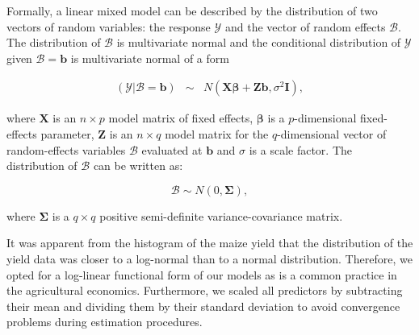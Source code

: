\documentclass[12pt]{iopart}
\begin{document}
Formally, a linear mixed model can be described by the distribution of two vectors of random variables: the response $\mathscr{Y}$ and the vector of random effects $\mathscr{B}$. The distribution of $\mathscr{B}$ is multivariate normal and the conditional distribution of $\mathscr{Y}$ given $\mathscr{B}=\mathbf{b}$ is multivariate normal of a form %




\begin{equation}\label{MixedGeneral}
\begin{array}{lcl}

(\mathscr{Y}|\mathscr{B}=\mathbf{b})& \sim & \mathit{N}(\mathbf{X}\mathbf{\beta}+\mathbf{Z}\mathbf{b},\sigma^2\mathbf{I}),

\end{array}
\end{equation}

where $\mathbf{X}$ is an $n \times p$ model matrix of fixed effects, $\mathbf{\beta}$ is a $p$-dimensional fixed-effects parameter, $\mathbf{Z}$ is an $n \times q$ model matrix for the $q$-dimensional vector of random-effects variables $\mathscr{B}$ evaluated at $\mathbf{b}$ and $\sigma$ is a scale factor. The distribution of $\mathscr{B}$ can be written as: 

\begin{equation}\label{ranefDist}
\mathscr{B} \sim \mathit{N}(0,\mathbf{\Sigma}),
\end{equation}

where $\mathbf{\Sigma}$ is a $q \times q$ positive semi-definite variance-covariance matrix.





It was apparent from the histogram of the maize yield that the distribution of the yield data was closer to a log-normal than to a normal distribution. Therefore, we opted for a log-linear functional form of our models as is a common practice in the agricultural economics. Furthermore, we scaled all predictors by subtracting their mean and dividing them by their standard deviation to avoid convergence problems during estimation procedures.
\end{document}
